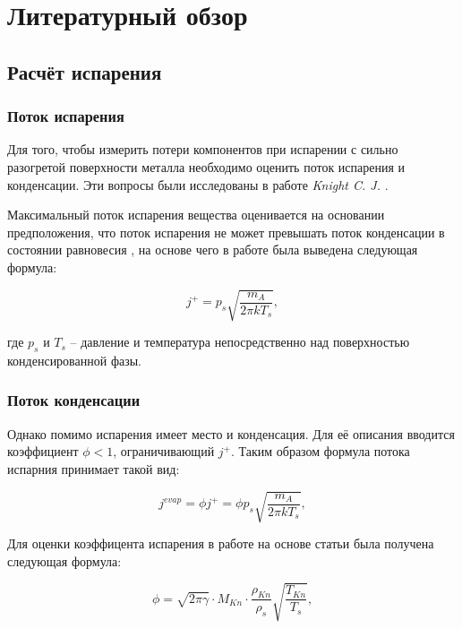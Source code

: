 \section{Литературный обзор}

\subsection{Расчёт испарения}

\subsubsection{Поток испарения}

Для того, чтобы измерить потери компонентов при испарении с сильно разогретой поверхности металла необходимо оценить поток испарения и конденсации. 
Эти вопросы были исследованы в работе \textit{Knight C. J.} \cite{knight1979theoretical}. 

Максимальный поток испарения вещества оценивается на основании предположения, что поток испарения не может превышать поток конденсации в состоянии равновесия \cite{hertz1882ueber}, на основе чего в работе \cite{langmuir1913vapor} была выведена следующая формула:

\begin{equation}
\label{eq:evap_max}
    j^+ = p_s\sqrt{\frac{m_A}{2\pi k T_s}},
\end{equation} 

\noindent
где $p_s$ и $T_s$ -- давление и температура непосредственно над поверхностью конденсированной фазы.

\subsubsection{Поток конденсации}

Однако помимо испарения имеет место и конденсация. Для её описания вводится коэффициент $\phi < 1$, ограничивающий $j^+$. Таким образом формула потока испарния принимает такой вид:

\begin{equation}
    \label{eq:evap}
    j^{evap} = \phi j^+ = \phi p_s\sqrt{\frac{m_A}{2\pi k T_s}},
\end{equation}

Для оценки коэффицента испарения в работе \cite{klassen2018simulation} на основе статьи \cite{knight1979theoretical} была получена следующая формула:

\begin{equation}
    \label{eq:evap_coeff}
    \phi = \sqrt{2\pi\gamma} \cdot M_{Kn} \cdot \frac{\rho_{Kn}}{\rho_s} \sqrt{\frac{T_{Kn}}{T_s}},
\end{equation}

